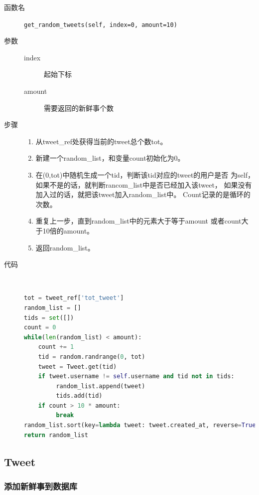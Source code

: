 \documentclass{yaldc}
\begin{document}
\begin{description}
    \item[函数名] \verb|get_random_tweets(self, index=0, amount=10)|
    \item[参数]
        \begin{description}
            \item[index] 起始下标
            \item[amount] 需要返回的新鲜事个数
        \end{description}
    \item[步骤]
        \begin{enumerate}
            \item 从tweet\_ref处获得当前的tweet总个数tot。
            \item 新建一个random\_list，和变量count初始化为0。
            \item 在(0,tot)中随机生成一个tid，判断该tid对应的tweet的用户是否
                为self，如果不是的话，就判断rancom\_list中是否已经加入该tweet，
                如果没有加入过的话，就把该tweet加入random\_list中。
                Count记录的是循环的次数。
            \item 重复上一步，直到random\_list中的元素大于等于amount
                或者count大于10倍的amount。
            \item 返回random\_list。
        \end{enumerate}
    \item[代码] ~
        \begin{lstlisting}[language=Python]
tot = tweet_ref['tot_tweet']
random_list = []
tids = set([])
count = 0
while(len(random_list) < amount):
    count += 1
    tid = random.randrange(0, tot)
    tweet = Tweet.get(tid)
    if tweet.username != self.username and tid not in tids:
         random_list.append(tweet)
         tids.add(tid)
    if count > 10 * amount:
         break
random_list.sort(key=lambda tweet: tweet.created_at, reverse=True)
return random_list
        \end{lstlisting}
\end{description}

\subsection{Tweet}

\subsubsection{添加新鲜事到数据库}
\end{document}
